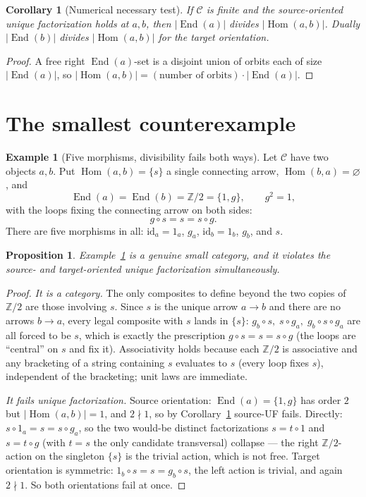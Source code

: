\documentclass[11pt]{article}
\newtheorem{proposition}[theorem]{Proposition}
\newtheorem{corollary}[theorem]{Corollary}
\theoremstyle{definition}
\newtheorem{example}[theorem]{Example}
\newcommand{\Hom}{\operatorname{Hom}}
\newcommand{\End}{\operatorname{End}}
\newcommand{\id}{\mathrm{id}}
\newcommand{\C}{\mathcal{C}}
\newcommand{\Z}{\mathbb{Z}}
\begin{document}
\begin{corollary}[Numerical necessary test]\label{cor:div}
If $\C$ is finite and the source-oriented unique factorization holds at $a,b$,
then $\lvert \End(a)\rvert$ divides $\lvert \Hom(a,b)\rvert$. Dually
$\lvert \End(b)\rvert$ divides $\lvert \Hom(a,b)\rvert$ for the target
orientation.
\end{corollary}

\begin{proof}
A free right $\End(a)$-set is a disjoint union of orbits each of size $\lvert
\End(a)\rvert$, so $\lvert \Hom(a,b)\rvert = (\text{number of orbits}) \cdot
\lvert \End(a)\rvert$.
\end{proof}

\section{The smallest counterexample}

\begin{example}[Five morphisms, divisibility fails both ways]\label{ex:main}
Let $\C$ have two objects $a,b$. Put $\Hom(a,b) = \{s\}$ a single connecting
arrow, $\Hom(b,a) = \varnothing$, and
\[
  \End(a) = \End(b) = \Z/2 = \{1, g\}, \qquad g^2 = 1,
\]
with the loops fixing the connecting arrow on both sides:
\[
  g \circ s = s = s \circ g.
\]
There are five morphisms in all: $\id_a = 1_a$, $g_a$, $\id_b = 1_b$, $g_b$,
and $s$.
\end{example}

\begin{proposition}
Example~\ref{ex:main} is a genuine small category, and it violates the source-
\emph{and} target-oriented unique factorization simultaneously.
\end{proposition}

\begin{proof}
\emph{It is a category.} The only composites to define beyond the two copies of
$\Z/2$ are those involving $s$. Since $s$ is the unique arrow $a\to b$ and there
are no arrows $b \to a$, every legal composite with $s$ lands in $\{s\}$:
$g_b \circ s, \; s \circ g_a, \; g_b \circ s \circ g_a$ are all forced to be
$s$, which is exactly the prescription $g\circ s = s = s\circ g$ (the loops are
``central'' on $s$ and fix it). Associativity holds because each $\Z/2$ is
associative and any bracketing of a string containing $s$ evaluates to $s$
(every loop fixes $s$), independent of the bracketing; unit laws are immediate.

\emph{It fails unique factorization.} Source orientation: $\End(a) = \{1,g\}$
has order $2$ but $\lvert \Hom(a,b)\rvert = 1$, and $2 \nmid 1$, so by
Corollary~\ref{cor:div} source-UF fails. Directly: $s \circ 1_a = s = s \circ
g_a$, so the two would-be distinct factorizations $s = t\circ 1$ and $s = t
\circ g$ (with $t = s$ the only candidate transversal) collapse --- the right
$\Z/2$-action on the singleton $\{s\}$ is the trivial action, which is not free.
Target orientation is symmetric: $1_b \circ s = s = g_b \circ s$, the left
action is trivial, and again $2 \nmid 1$. So both orientations fail at once.
\end{proof}
\end{document}

